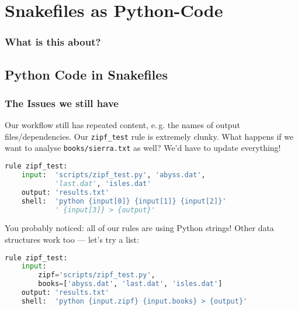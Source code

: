 \section{Snakefiles as Python-Code}

\begin{frame}
  \frametitle{What is this about?}
\end{frame}

\subsection{Python Code in Snakefiles}

\begin{frame}[fragile]
  \frametitle{The Issues we still have}
  Our workflow still has repeated content, e.\,g. the names of output files/dependencies. Our \texttt{zipf\_test} rule is extremely clunky. What happens if we want to analyse \texttt{books/sierra.txt} as well? We’d have to update everything!
  \begin{lstlisting}[language=Python,style=Python, basicstyle=\tiny]
rule zipf_test:
    input:  'scripts/zipf_test.py', 'abyss.dat',
            'last.dat', 'isles.dat'
    output: 'results.txt'
    shell:  'python {input[0]} {input[1]} {input[2]}'
            ' {input[3]} > {output}'
  \end{lstlisting}
  You probably noticed: all of our rules are using Python strings! Other data structures work too — let’s try a list:
  \begin{lstlisting}[language=Python,style=Python, basicstyle=\tiny]
rule zipf_test:
    input:
        zipf='scripts/zipf_test.py',
        books=['abyss.dat', 'last.dat', 'isles.dat']
    output: 'results.txt'
    shell:  'python {input.zipf} {input.books} > {output}'
  \end{lstlisting}
\end{frame}

